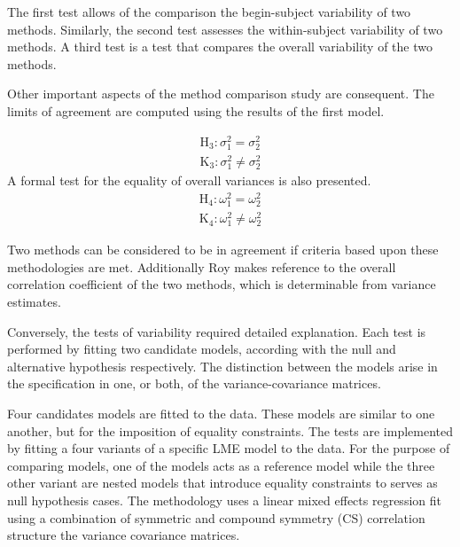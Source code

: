 \documentclass[12pt, a4paper]{report}
\theoremstyle{plain}
\theoremstyle{definition}
\theoremstyle{remark}
\begin{document}
		
		
		The first test allows of the comparison the begin-subject variability of two methods. Similarly, the second test
		assesses the within-subject variability of two methods. A third test is a test that compares the overall variability of the two methods.
		
		Other important aspects of the method comparison study are consequent. The limits of agreement are computed using the results of the first model.
	
	
	\begin{eqnarray*}
		\operatorname{H_3} : \sigma^2_1 = \sigma^2_2 \\
		\operatorname{K_3} : \sigma^2_1 \neq \sigma^2_2
	\end{eqnarray*}
	A formal test for the equality of overall variances is also presented.
	\begin{eqnarray*}
		\operatorname{H_4} : \omega^2_1 = \omega^2_2 \\
		\operatorname{K_4} : \omega^2_1 \neq \omega^2_2
	\end{eqnarray*}

	Two methods can be considered to be in agreement if criteria based upon these methodologies are met. Additionally Roy makes reference to the overall correlation coefficient of the two methods, which is determinable from variance estimates.
	
	Conversely, the tests of variability required detailed explanation. Each test is performed by fitting two candidate models, according with the null and alternative hypothesis respectively. The distinction between the models arise in the specification in one, or both, of the variance-covariance matrices. %
		
Four candidates models are fitted to the data. These models are similar to one another, but for the imposition of equality constraints. The tests are implemented by fitting a four variants of a specific LME model to the data. For the purpose of comparing models, one of the models acts as a reference model while the three other variant are nested models that introduce equality constraints to serves as null hypothesis cases. The methodology uses a linear mixed effects regression fit using a combination of symmetric and compound symmetry (CS) correlation structure the variance covariance matrices.
		
\end{document}
